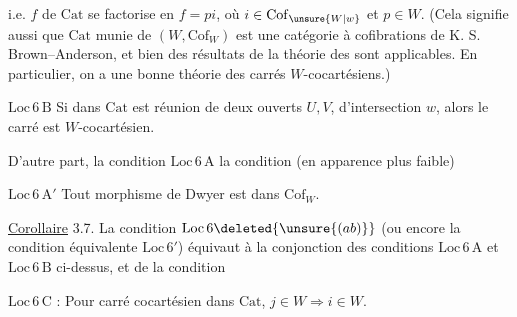 
i.e.   $f$ de $\mathrm{Cat}$ se factorise en $f=pi$, où $i\in\mathrm{Cof}_{\unsure{W|w}}$ et $p\in W$. (Cela signifie aussi que $\mathrm{Cat}$ munie de $(W,\mathrm{Cof}_W)$ est une catégorie à cofibrations de K. S. Brown--Anderson, et bien des résultats de la théorie des  sont applicables. En particulier, on a une bonne théorie des carrés $W$-cocartésiens.)

\uline{$\mathrm{Loc}\,6\,\mathrm B$} Si  dans $\mathrm{Cat}$ est réunion de deux ouverts $U,V$, d'intersection $w$, alors le carré
est $W$-cocartésien.

D'autre part, la condition $\mathrm{Loc}\,6\,\mathrm A$     la condition (en apparence plus faible)

\uline{$\mathrm{Loc}\,6\,\mathrm A'$} Tout morphisme de Dwyer est dans $\mathrm{Cof}_W$.

\uline{Corollaire} 3.7. La condition $\mathrm{Loc}\,6\deleted{\unsure{(ab)}}$  (ou encore la condition équivalente $\mathrm{Loc}\,6'$) équivaut à la conjonction des conditions $\mathrm{Loc}\,6\,\mathrm A$  et $\mathrm{Loc}\,6\,\mathrm B$ ci-dessus, et de la condition

\uline{$\mathrm{Loc}\,6\,\mathrm C$} : Pour  carré cocartésien
dans $\mathrm{Cat}$, $j\in W\Longrightarrow i\in W$.
